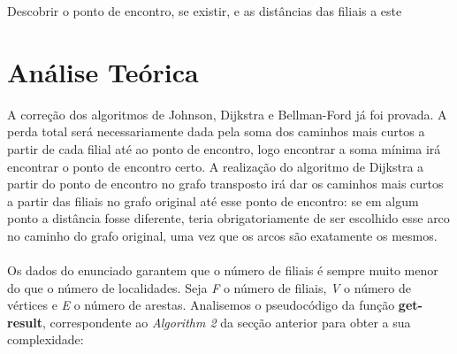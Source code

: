\documentclass[12pt,a4paper,notitlepage]{article}
\begin{document}
\begin{algorithm}[H]
    \caption{Descobrir o ponto de encontro, se existir, e as distâncias das filiais a este}
\end{algorithm}
\pagebreak
\section{Análise Teórica}
A correção dos algoritmos de Johnson, Dijkstra e Bellman-Ford já foi provada.
A perda total será necessariamente dada pela soma dos caminhos mais curtos a partir de cada filial até ao ponto de encontro, logo encontrar a soma mínima irá encontrar o ponto de encontro certo.
A realização do algoritmo de Dijkstra a partir do ponto de encontro no grafo transposto irá dar os caminhos mais curtos a partir das filiais no grafo original até esse ponto de encontro: se em algum ponto a distância fosse diferente, teria obrigatoriamente de ser escolhido esse arco no caminho do grafo original, uma vez que os arcos são exatamente os mesmos.
\\
\\
Os dados do enunciado garantem que o número de filiais é sempre muito menor do que o número de localidades.
Seja \emph{F} o número de filiais, \emph{V} o número de vértices e \emph{E} o número de arestas.
Analisemos o pseudocódigo da função \textbf{get-result}, correspondente ao \emph{Algorithm 2} da secção anterior para obter a sua complexidade:
\end{document}
